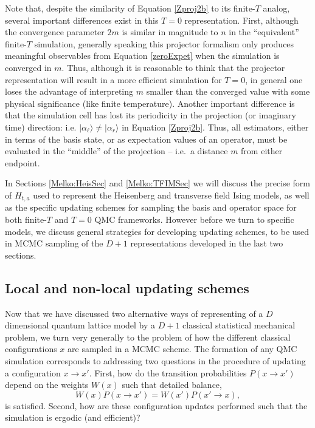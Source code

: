 \documentclass[vecphys]{svmult}
\begin{document}
Note that, despite the similarity of Equation \ref{Zproj2b} to its finite-$T$ analog, several important differences exist in this $T=0$ representation.  First, although the convergence parameter $2m$ is similar in magnitude to $n$ in the ``equivalent'' finite-$T$ simulation, 
generally speaking this projector formalism only produces meaningful observables from Equation \ref{zeroExpet} when the simulation is converged in $m$.  Thus, although it is reasonable to think that the projector representation will result in a more efficient simulation for $T=0$, in general one loses the advantage of interpreting $m$ smaller than the converged value with some physical significance (like finite temperature).
Another important difference is that the simulation cell has lost its periodicity in the projection (or imaginary time) direction: i.e. $| \alpha_{\ell} \rangle \neq | \alpha_r \rangle$ in Equation \ref{Zproj2b}.  Thus, all estimators, either in terms of the basis state, or as expectation values of an operator, must be evaluated in the ``middle'' of the projection -- i.e.~a distance $m$ from either endpoint.

In Sections \ref{Melko:HeisSec} and \ref{Melko:TFIMSec} we will discuss the precise form of $H_{t,a}$ used to represent the Heisenberg and transverse field Ising models, as well as the specific updating schemes for sampling the basis and operator space for both finite-$T$ and $T=0$ QMC frameworks.  However before we turn to specific models, we discuss general strategies for developing updating schemes, to be used in MCMC sampling of the $D+1$ representations developed in the last two sections.


\subsection{Local and non-local updating schemes} \label{Melko:updates}

Now that we have discussed two alternative ways of representing of a $D$ dimensional quantum lattice model by a $D+1$ classical statistical mechanical problem, we turn very generally to the problem of how the different classical configurations $x$ are sampled in a MCMC scheme.
The formation of any QMC simulation corresponds to addressing two questions in the procedure of updating a configuration $x \rightarrow x'$. First, how do the transition probabilities $P(x \rightarrow x')$ depend on the weights $W(x)$ such that detailed balance,
\begin{equation}
 W(x)P(x \rightarrow x') = W(x')P(x' \rightarrow x), \label{detb}
 \end{equation}
 is satisfied. Second, how are these configuration updates performed such that the simulation is ergodic (and efficient)?
\end{document}
